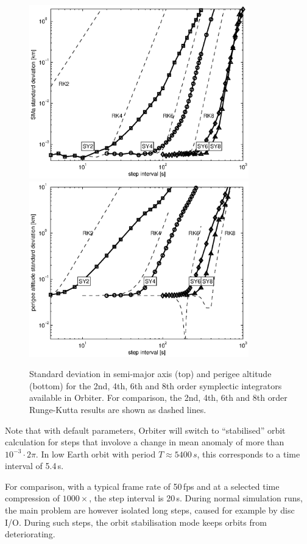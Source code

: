 \documentclass[Orbiter Technical Reference.tex]{subfiles}
\begin{document}
\begin{figure}[H]\centering
\includegraphics[width=0.85\textwidth]{sma_symp_std}
\includegraphics[width=0.85\textwidth]{pea_symp_std}
\caption{Standard deviation in semi-major axis (top) and perigee altitude (bottom) for the 2nd, 4th, 6th and 8th order symplectic integrators available in Orbiter. For comparison, the 2nd, 4th, 6th and 8th order Runge-Kutta results are shown as dashed lines.}
\label{fig:symp_err}
\end{figure}

Note that with default parameters, Orbiter will switch to ``stabilised'' orbit calculation for steps that involove a change in mean anomaly of more than $10^{-3} \cdot 2\pi$. In low Earth orbit with period $T\approx5400\,s$, this corresponds to a time interval of 5.4\,s.

For comparison, with a typical frame rate of 50\,fps and at a selected time compression of $1000\times$, the step interval is 20\,s. During normal simulation runs, the main problem are however isolated long steps, caused for example by disc I/O. During such steps, the orbit stabilisation mode keeps orbits from deteriorating. 
\end{document}
